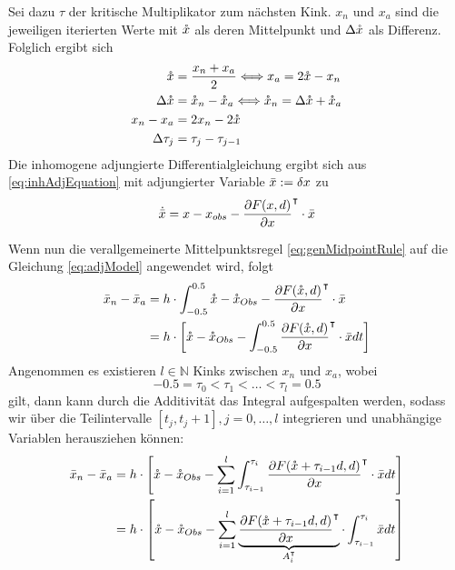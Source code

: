 Sei dazu $\tau$ der kritische Multiplikator zum nächsten Kink. $x_n$ und $x_a$ sind die jeweiligen iterierten Werte mit $\mathring{x}$ als deren Mittelpunkt und $\Delta \mathring{x}$ als Differenz. Folglich ergibt sich 
\begin{align*}
\mathring{x} &= \frac{x_n+x_a}{2}\Longleftrightarrow x_a = 2\mathring{x} - x_n\\
\Delta \mathring{x} &= \mathring{x}_n - \mathring{x}_a \Longleftrightarrow \mathring{x}_n = \Delta \mathring{x} + \mathring{x}_a\\
x_n - x_a &= 2x_n - 2\mathring{x}\\
\Delta \tau_j&=\tau_j-\tau_{j-1}
\end{align*}
Die inhomogene adjungierte Differentialgleichung ergibt sich aus \eqref{eq:inhAdjEquation} mit adjungierter Variable $\bar{x} := \delta x$ zu
\begin{equation}
\dot{\bar{x}} = x - x_{obs} - \frac{\partial F(x,d)}{\partial x}^\intercal \cdot \bar{x}
\label{eq:adjModel}
\end{equation}

Wenn nun die verallgemeinerte Mittelpunktsregel \eqref{eq:genMidpointRule} auf die Gleichung \eqref{eq:adjModel} angewendet wird, folgt
\begin{align*}
\bar{x}_n - \bar{x}_a &= h\cdot \int_{-0.5}^{0.5}\mathring{x}-\mathring{x}_{Obs} - \frac{\partial F(\mathring{x},d)}{\partial x}^\intercal \cdot \bar{x}\\
									&= h\cdot \left[\mathring{x}-\mathring{x}_{Obs} - \int_{-0.5}^{0.5} \frac{\partial F(\mathring{x} ,d)}{\partial x}^\intercal \cdot \bar{x} dt\right]\\
\end{align*}
Angenommen es existieren $l \in \mathbb{N}$ Kinks zwischen $x_n$ und $x_{a}$, wobei \[-0.5 = \tau_0 <\tau_1 <\ldots < \tau_l=0.5\] gilt, dann kann durch die Additivität das Integral aufgespalten werden, sodass wir über die Teilintervalle $[t_j,t_j+1], j=0,\ldots,l$ integrieren und unabhängige Variablen herausziehen können:
\begin{align*}
\bar{x}_n - \bar{x}_a &= h\cdot \left[ \mathring{x}-\mathring{x}_{Obs} - \sum_{i=1}^l \int_{\tau_{i-1}}^{\tau_{i}}\frac{\partial F(\mathring{x}+\tau_{i-1}d,d)}{\partial x}^\intercal \cdot \bar{x} dt\right]\\
									&= h\cdot \left[\mathring{x} -\mathring{x}_{Obs} - \sum_{i=1}^l \underbrace{\frac{\partial F(\mathring{x}+\tau_{i-1}d,d)}{\partial x}^\intercal }_{A_i^\intercal} \cdot \int_{\tau_{i-1}}^{\tau_{i}} \bar{x} dt\right]\\
\end{align*}

